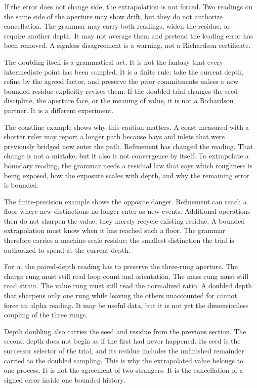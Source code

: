 If the error does not change side, the extrapolation is not forced. Two
readings on the same side of the aperture may show drift, but they do not
authorize cancellation. The grammar may carry both readings, widen the
residue, or require another depth. It may not average them and pretend the
leading error has been removed. A signless disagreement is a warning, not a
Richardson certificate.

The doubling itself is a grammatical act. It is not the fantasy that every
intermediate point has been sampled. It is a finite rule: take the current
depth, refine by the agreed factor, and preserve the prior commitments unless
a new bounded residue explicitly revises them. If the doubled trial changes
the seed discipline, the aperture face, or the meaning of value, it is not a
Richardson partner. It is a different experiment.

The coastline example shows why this caution matters. A coast measured with
a shorter ruler may report a longer path because bays and inlets that were
previously bridged now enter the path. Refinement has changed the reading.
That change is not a mistake, but it also is not convergence by itself. To
extrapolate a boundary reading, the grammar needs a residual law that says
which roughness is being exposed, how the exposure scales with depth, and
why the remaining error is bounded.

The finite-precision example shows the opposite danger. Refinement can reach
a floor where new distinctions no longer enter as new events. Additional
operations then do not sharpen the value; they merely recycle existing
residue. A bounded extrapolation must know when it has reached such a floor.
The grammar therefore carries a machine-scale residue: the smallest
distinction the trial is authorized to spend at the current depth.

For \(\alpha\), the paired-depth reading has to preserve the three-rung
aperture. The charge rung must still read loop count and orientation. The
mass rung must still read strain. The value rung must still read the
normalized ratio. A doubled depth that sharpens only one rung while leaving
the others unaccounted for cannot force an alpha reading. It may be useful
data, but it is not yet the dimensionless coupling of the three rungs.

Depth doubling also carries the seed and residue from the previous section.
The second depth does not begin as if the first had never happened. Its seed
is the successor selector of the trial, and its residue includes the
unfinished remainder carried to the doubled sampling. This is why the
extrapolated value belongs to one process. It is not the agreement of two
strangers. It is the cancellation of a signed error inside one bounded
history.

